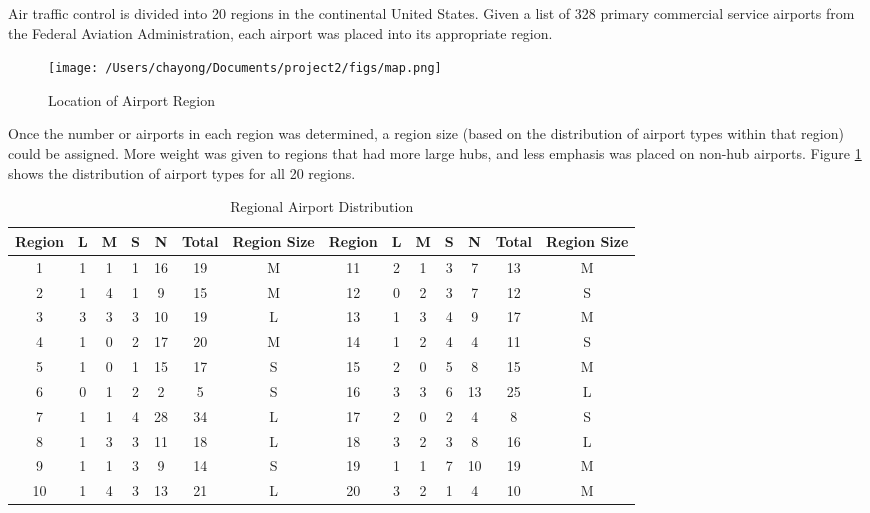 Air traffic control is divided into 20 regions in the continental United States. Given a list of 328
primary commercial service airports from the Federal Aviation Administration, each airport was
placed into its appropriate region.

\begin{figure} [htb]
\centering
\texttt{[image: /Users/chayong/Documents/project2/figs/map.png]}
\caption{Location of Airport Region}
\label{fig:airport_region}
\end{figure}


Once the number or airports in each region was determined, a region size (based on the
distribution of airport types within that region) could be assigned. More weight was given to
regions that had more large hubs, and less emphasis was placed on non-hub airports.
Figure \ref{fig:airport_region} shows the distribution of airport types for all 20 regions.

\begin{table} [htb]
\begin{center}
\addtolength{\tabcolsep}{-0pt}
\tiny
\caption{Regional Airport Distribution}
\label{table:regional_airport_dist}
\begin{tabular}{|c|c|c|c|c|c|c|c|c|c|c|c|c|c|}\hline

Region & L & M & S & N & Total & Region Size & Region & L & M & S & N & Total & Region Size  \\\hline
1 & 1 & 1 & 1 & 16 & 19 & M & 11 & 2 & 1 & 3 & 7 & 13 & M  \\\hline
2 & 1 & 4 & 1 & 9 & 15 & M & 12 & 0 & 2 & 3 & 7 & 12 & S  \\\hline
3 & 3 & 3 & 3 & 10 & 19 & L & 13 & 1 & 3 & 4 & 9 & 17 & M  \\\hline
4 & 1 & 0 & 2 & 17 & 20 & M & 14 & 1 & 2 & 4 & 4 & 11 & S  \\\hline
5 & 1 & 0 & 1 & 15 & 17 & S & 15 & 2 & 0 & 5 & 8 & 15 & M  \\\hline
6 & 0 & 1 & 2 & 2  & 5 & S & 16 & 3 & 3 & 6 & 13 & 25 & L  \\\hline
7 & 1 & 1 & 4 & 28 & 34 & L & 17 & 2 & 0 & 2 & 4 & 8 & S  \\\hline
8 & 1 & 3 & 3 & 11 & 18 & L & 18 & 3 & 2 & 3 & 8 & 16 & L  \\\hline
9 & 1 & 1 & 3 & 9 & 14 & S & 19 & 1 & 1 & 7 & 10 & 19 & M  \\\hline
10 & 1 & 4 & 3 & 13 & 21 & L & 20 & 3 & 2 & 1 & 4 & 10 & M  \\\hline
\end{tabular}
\end{center}
\end{table}

